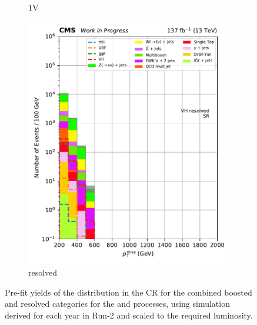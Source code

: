 \begin{figure}[htbp]
\begin{subfigure}[b]{0.24\textwidth}
        \caption{\VH 1V}
    \end{subfigure}
    \hfill
    \begin{subfigure}[b]{0.24\textwidth}
        \includegraphics[width=\textwidth]{figures/region_plots/2016to18/region_0/VH_resolved.pdf}
        \caption{\VH resolved}
    \end{subfigure}
    \caption[Pre-fit yields of the \ptmiss distribution in the signal region for the combined boosted and resolved categories for the \ttH and \VH processes, using simulation derived for each year in Run-2 and scaled to the required luminosity]{Pre-fit yields of the \ptmiss distribution in the \singleMuCr \gls{CR} for the combined boosted and resolved categories for the \ttH and \VH processes, using simulation derived for each year in Run-2 and scaled to the required luminosity.}
    \label{fig:htoinv_sr_yields_comb2016to18}
\end{figure}





